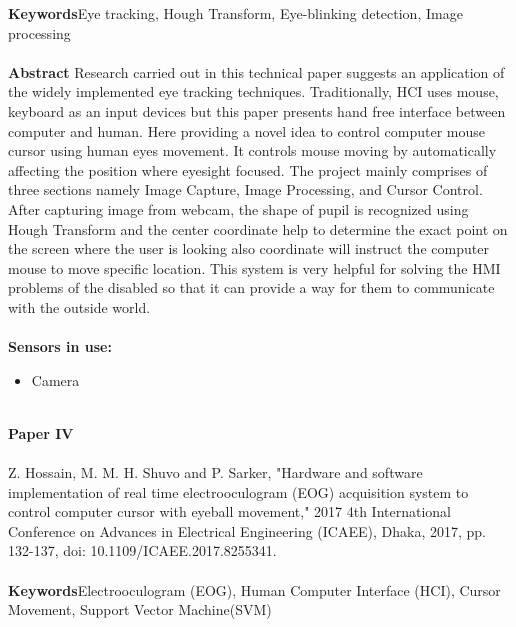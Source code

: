 \noindent
\textbf{Keywords}Eye tracking, Hough Transform, Eye-blinking detection, Image processing\\ \\

\noindent
\textbf{Abstract} Research carried out in this technical paper suggests an application of the widely implemented eye tracking techniques. Traditionally, HCI uses mouse, keyboard as an input devices but this paper presents hand free interface between computer and human. Here providing a novel idea to control computer mouse cursor using human eyes movement. It controls mouse moving by automatically affecting the position where eyesight focused. The project mainly comprises of three sections namely Image Capture, Image Processing, and Cursor Control. After capturing image from webcam, the shape of pupil is recognized using Hough Transform and the center coordinate help to determine the exact point on the screen where the user is looking also coordinate will instruct the computer mouse to move specific location. This system is very helpful for solving the HMI problems of the disabled so that it can provide a way for them to communicate with the outside world.
\\ \\


\noindent
\textbf{Sensors in use:}
\begin{itemize}
    \item Camera \\ \\
\end{itemize}


\noindent
\textbf{Paper IV} 
\\ \\
\noindent
Z. Hossain, M. M. H. Shuvo and P. Sarker, "Hardware and software implementation of real time electrooculogram (EOG) acquisition system to control computer cursor with eyeball movement," 2017 4th International Conference on Advances in Electrical Engineering (ICAEE), Dhaka, 2017, pp. 132-137, doi: 10.1109/ICAEE.2017.8255341.\\ \\


\noindent
\textbf{Keywords}Electrooculogram (EOG), Human Computer Interface (HCI), Cursor Movement, Support Vector Machine(SVM)\\ \\


